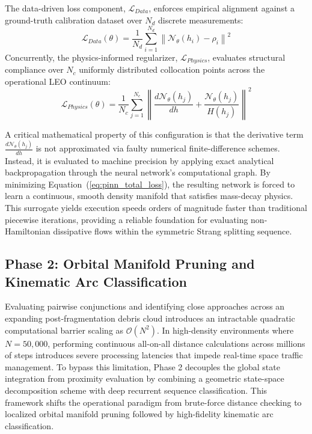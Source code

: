 \documentclass[letterpaper,11pt]{AAS}
\begin{document}
The data-driven loss component, $\mathcal{L}_{Data}$, enforces empirical alignment against a ground-truth calibration dataset over $N_d$ discrete measurements:
\begin{equation}
    \mathcal{L}_{Data}(\theta) = \frac{1}{N_d} \sum_{i=1}^{N_d} \left\| \mathcal{N}_\theta(h_i) - \rho_i \right\|^2
    \label{eq:l_data}
\end{equation}
Concurrently, the physics-informed regularizer, $\mathcal{L}_{Physics}$, evaluates structural compliance over $N_c$ uniformly distributed collocation points across the operational LEO continuum:
\begin{equation}
    \mathcal{L}_{Physics}(\theta) = \frac{1}{N_c} \sum_{j=1}^{N_c} \left\| \frac{d\mathcal{N}_\theta(h_j)}{dh} + \frac{\mathcal{N}_\theta(h_j)}{H(h_j)} \right\|^2
    \label{eq:l_physics}
\end{equation}

A critical mathematical property of this configuration is that the derivative term $\frac{d\mathcal{N}_\theta(h_j)}{dh}$ is not approximated via faulty numerical finite-difference schemes. Instead, it is evaluated to machine precision by applying exact analytical backpropagation through the neural network's computational graph. By minimizing Equation~(\ref{eq:pinn_total_loss}), the resulting network is forced to learn a continuous, smooth density manifold that satisfies mass-decay physics. This surrogate yields execution speeds orders of magnitude faster than traditional piecewise iterations, providing a reliable foundation for evaluating non-Hamiltonian dissipative flows within the symmetric Strang splitting sequence.

\subsection{Phase 2: Orbital Manifold Pruning and Kinematic Arc Classification}
\label{subsec:manifold_pruning_lstm}

Evaluating pairwise conjunctions and identifying close approaches across an expanding post-fragmentation debris cloud introduces an intractable quadratic computational barrier scaling as $\mathcal{O}(N^2)$. In high-density environments where $N = 50,000$, performing continuous all-on-all distance calculations across millions of steps introduces severe processing latencies that impede real-time space traffic management. To bypass this limitation, Phase 2 decouples the global state integration from proximity evaluation by combining a geometric state-space decomposition scheme with deep recurrent sequence classification. This framework shifts the operational paradigm from brute-force distance checking to localized orbital manifold pruning followed by high-fidelity kinematic arc classification.
\end{document}
